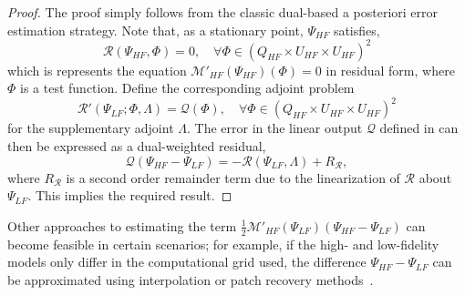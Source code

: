 \begin{proof}
%
The proof simply follows from the classic dual-based a posteriori error estimation strategy. Note that, as a stationary point, $\Psi_{HF}$ satisfies,
%
\begin{equation}
\mathscr{R}(\Psi_{HF},\Phi)=0,\quad\forall\Phi\in(Q_{HF}\times U_{HF}\times U_{HF})^2
\label{eq:supadjsys}
\end{equation}
%
which is represents the equation $\mathcal{M}'_{HF}(\Psi_{HF})(\Phi)=0$ in residual form, where $\Phi$ is a test function. Define the corresponding adjoint problem
%
\begin{equation}
\mathscr{R}'(\Psi_{LF};\Phi,\Lambda)=\mathcal{Q}(\Phi),\quad\forall\Phi\in(Q_{HF}\times U_{HF}\times U_{HF})^2
\label{eq:superAdjEq}
\end{equation}
%
for the supplementary adjoint $\Lambda$. The error in the linear output $\mathcal{Q}$ defined in  can then be expressed as a dual-weighted residual,
%
\begin{equation}
\label{eq:adjOutErr}
\mathcal{Q}(\Psi_{HF}-\Psi_{LF})=-\mathscr{R}(\Psi_{LF},\Lambda) + R_{\mathscr{R}},
\end{equation}
%
where $R_{\mathscr{R}}$ is a second order remainder term due to the linearization of $\mathscr{R}$ about $\Psi_{LF}$. This implies the required result. 
%
\end{proof}
%
Other approaches to estimating the term $\frac{1}{2}\mathcal{M}'_{HF}(\Psi_{LF})(\Psi_{HF}-\Psi_{LF})$ can become feasible in certain scenarios; for example, if the high- and low-fidelity models only differ in the computational grid used, the difference $\Psi_{HF}-\Psi_{LF}$ can be approximated using interpolation or patch recovery methods~\cite{BecVex05}.
